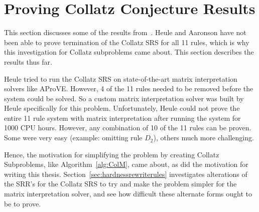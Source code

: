 \section{Proving Collatz Conjecture Results} \label{sec:provingCollatzresults}
This section discusses some of the results from~\cite{HeuleAaronson}. Heule and Aaronson have not been able to prove termination of the Collatz SRS for all 11 rules, which is why this investigation for Collatz subproblems came about. This section describes the results thus far. \par
Heule tried to run the Collatz SRS on state-of-the-art matrix interpretation solvers like AProVE. However, 4 of the 11 rules needed to be removed before the system could be solved. So a custom matrix interpretation solver was built by Heule specifically for this problem. 
Unfortunately, Heule could not prove the entire 11 rule system with matrix interpretation after running the system for 1000 CPU hours. However, any combination of 10 of the 11 rules can be proven. Some were very easy (example: omitting rule $D_2$), others much more challenging.\par
Hence, the motivation for simplifying the problem by creating Collatz Subproblems, like Algorithm~\ref{alg:ColM}, came about, as did the motivation for writing this thesis. Section~\ref{sec:hardnessrewriterules} investigates alterations of the SRR's for the Collatz SRS to try and make the problem simpler for the matrix interpretation solver, and see how difficult these alternate forms ought to be to prove.